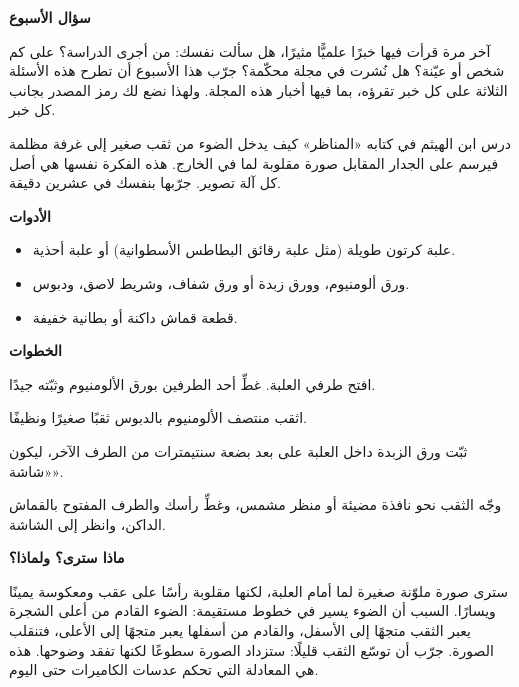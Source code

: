 \documentclass[11pt]{article}
\begin{document}
\begin{feature}
{\sansfont\bfseries\color{gold} سؤال الأسبوع}\par
آخر مرة قرأت فيها خبرًا علميًّا مثيرًا، هل سألت نفسك: من أجرى الدراسة؟ على كم شخص أو عيّنة؟ هل نُشرت في مجلة محكّمة؟ جرّب هذا الأسبوع أن تطرح هذه الأسئلة الثلاثة على كل خبر تقرؤه، بما فيها أخبار هذه المجلة. ولهذا نضع لك رمز المصدر بجانب كل خبر.
\end{feature}
\newpage


درس ابن الهيثم في كتابه «المناظر» كيف يدخل الضوء من ثقب صغير إلى غرفة مظلمة فيرسم على الجدار المقابل صورة مقلوبة لما في الخارج. هذه الفكرة نفسها هي أصل كل آلة تصوير. جرّبها بنفسك في عشرين دقيقة.

\begin{feature}[colframe=teal!70]
{\sansfont\bfseries\color{teal} الأدوات}
\begin{itemize}[nosep,label=\textcolor{teal}{◆}]
 \item علبة كرتون طويلة (مثل علبة رقائق البطاطس الأسطوانية) أو علبة أحذية.
 \item ورق ألومنيوم، وورق زبدة أو ورق شفاف، وشريط لاصق، ودبوس.
 \item قطعة قماش داكنة أو بطانية خفيفة.
\end{itemize}
\end{feature}

{\sansfont\bfseries\color{teal} الخطوات}
\begin{enumerate}[label=\textcolor{teal}{\sansfont\bfseries\textarabic[numerals=mashriq]{\arabic*}.},leftmargin=*]
 \item افتح طرفي العلبة. غطِّ أحد الطرفين بورق الألومنيوم وثبّته جيدًا.
 \item اثقب منتصف الألومنيوم بالدبوس ثقبًا صغيرًا ونظيفًا.
 \item ثبّت ورق الزبدة داخل العلبة على بعد بضعة سنتيمترات من الطرف الآخر، ليكون «شاشة».
 \item وجّه الثقب نحو نافذة مضيئة أو منظر مشمس، وغطِّ رأسك والطرف المفتوح بالقماش الداكن، وانظر إلى الشاشة.
\end{enumerate}

{\sansfont\bfseries\color{teal} ماذا سترى؟ ولماذا؟}\par
سترى صورة ملوّنة صغيرة لما أمام العلبة، لكنها مقلوبة رأسًا على عقب ومعكوسة يمينًا ويسارًا. السبب أن الضوء يسير في خطوط مستقيمة: الضوء القادم من أعلى الشجرة يعبر الثقب متجهًا إلى الأسفل، والقادم من أسفلها يعبر متجهًا إلى الأعلى، فتنقلب الصورة. جرّب أن توسّع الثقب قليلًا: ستزداد الصورة سطوعًا لكنها تفقد وضوحها. هذه هي المعادلة التي تحكم عدسات الكاميرات حتى اليوم.
\end{document}
